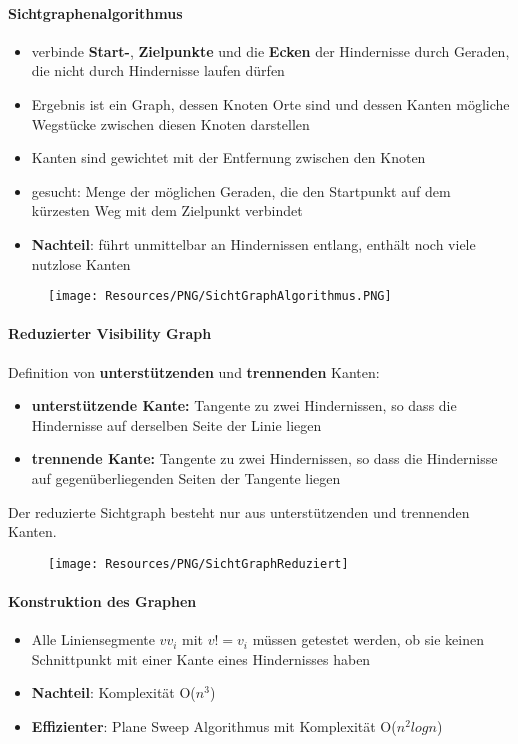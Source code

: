 \paragraph{Sichtgraphenalgorithmus}
\begin{itemize}
	\item verbinde \textbf{Start-}, \textbf{Zielpunkte} und die \textbf{Ecken} der Hindernisse durch Geraden, die nicht durch Hindernisse laufen dürfen
	\item Ergebnis ist ein Graph, dessen Knoten Orte sind und dessen Kanten mögliche Wegstücke zwischen diesen Knoten darstellen
	\item Kanten sind gewichtet mit der Entfernung zwischen den Knoten
	\item gesucht: Menge der möglichen Geraden, die den Startpunkt auf dem kürzesten Weg mit dem Zielpunkt verbindet
	\item \textbf{Nachteil}: führt unmittelbar an Hindernissen entlang, enthält noch viele nutzlose Kanten
\end{itemize}
\begin{figure}[H]
	\begin{center}
		\texttt{[image: Resources/PNG/SichtGraphAlgorithmus.PNG]}
		\caption{}
		\label{fig:PNG/SichtGraphAlgorithmus.PNG}
	\end{center}
\end{figure}
\paragraph{Reduzierter Visibility Graph}
Definition von \textbf{unterstützenden} und \textbf{trennenden} Kanten:
\begin{itemize}
	\item \textbf{unterstützende Kante:} Tangente zu zwei Hindernissen, so dass die Hindernisse auf derselben Seite der Linie liegen
	\item \textbf{trennende Kante:} Tangente zu zwei Hindernissen, so dass die Hindernisse auf gegenüberliegenden Seiten der Tangente liegen
\end{itemize}
Der reduzierte Sichtgraph besteht nur aus unterstützenden und trennenden Kanten.
\begin{figure}[H]
	\begin{center}
		\texttt{[image: Resources/PNG/SichtGraphReduziert]}
		\caption{}
		\label{fig:PNG/SichtGraphReduziert.PNG}
	\end{center}
\end{figure}
\paragraph{Konstruktion des Graphen}
\begin{itemize}
	\item Alle Liniensegmente $vv_i$ mit $v != v_i$ müssen getestet werden, ob sie keinen Schnittpunkt mit einer Kante eines Hindernisses haben
	\item \textbf{Nachteil}: Komplexität O($n^3$)
	\item \textbf{Effizienter}: Plane Sweep Algorithmus mit Komplexität O($n^2 log n$)
\end{itemize}
